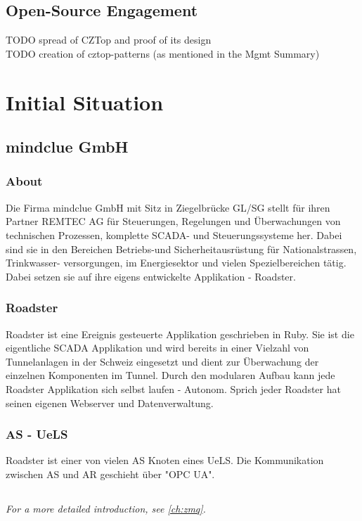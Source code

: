 \subsection{Open-Source Engagement}
TODO spread of CZTop and proof of its design\\
TODO creation of cztop-patterns (as mentioned in the Mgmt Summary)\\

\section{Initial Situation}

\subsection{mindclue GmbH}
\subsubsection{About}
Die Firma mindclue GmbH mit Sitz in Ziegelbrücke GL/SG stellt für ihren
Partner REMTEC AG für Steuerungen, Regelungen und Überwachungen von technischen Prozessen,
komplette SCADA- und Steuerungssysteme her. Dabei sind sie in den Bereichen
Betriebs-und Sicherheitausrüstung für Nationalstrassen, Trinkwasser-
versorgungen, im Energiesektor und vielen Spezielbereichen tätig.
Dabei setzen sie auf ihre eigens entwickelte Applikation - Roadster.

\subsubsection{Roadster}
Roadster ist eine Ereignis gesteuerte Applikation geschrieben in Ruby.
Sie ist die eigentliche \gls{SCADA} Applikation und wird bereits in einer Vielzahl von
Tunnelanlagen in der Schweiz eingesetzt und dient zur Überwachung der einzelnen Komponenten im Tunnel.
Durch den modularen Aufbau kann jede Roadster Applikation sich selbst laufen - Autonom.
Sprich jeder Roadster hat seinen eigenen Webserver und Datenverwaltung.

\subsubsection{AS - UeLS}
Roadster ist einer von vielen AS Knoten eines UeLS. Die Kommunikation
zwischen AS und AR geschieht über "OPC UA".


\subsection{\zmq}
\emph{For a more detailed introduction, see \autoref{ch:zmq}.}

